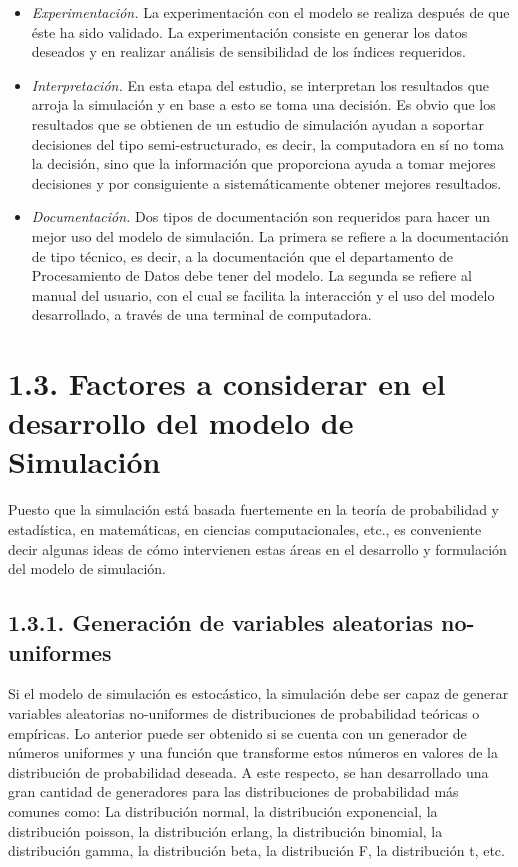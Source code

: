 \documentclass[11pt,letterpaper]{report}
\begin{document}
\begin{itemize}[leftmargin=*]
\item \emph{Experimentación.} La experimentación con el modelo se
realiza después de que éste ha sido validado. La experimentación
consiste en generar los datos deseados y en realizar análisis de
sensibilidad de los índices requeridos.

\item \emph{Interpretación.} En esta etapa del estudio, se interpretan
los resultados que arroja la simulación y en base a esto se toma una
decisión. Es obvio que los resultados que se obtienen de un estudio de
simulación ayudan a soportar decisiones del tipo semi-estructurado, es
decir, la computadora en sí no toma la decisión, sino que la información
que proporciona ayuda a tomar mejores decisiones y por consiguiente a
sistemáticamente obtener mejores resultados.

\item \emph{Documentación.} Dos tipos de documentación son requeridos
para hacer un mejor uso del modelo de simulación. La primera se refiere
a la documentación de tipo técnico, es decir, a la documentación que el
departamento de Procesamiento de Datos debe tener del modelo. La segunda
se refiere al manual del usuario, con el cual se facilita la interacción
y el uso del modelo desarrollado, a través de una terminal de
computadora.
\end{itemize}

\section*{1.3. Factores a considerar en el desarrollo del modelo de Simulación}

Puesto que la simulación está basada fuertemente en la teoría de
probabilidad y estadística, en matemáticas, en ciencias computacionales,
etc., es conveniente decir algunas ideas de cómo intervienen estas áreas
en el desarrollo y formulación del modelo de simulación.

\subsection*{1.3.1. Generación de variables aleatorias no-uniformes}

Si el modelo de simulación es estocástico, la simulación debe ser capaz
de generar variables aleatorias no-uniformes de distribuciones de
probabilidad teóricas o empíricas. Lo anterior puede ser obtenido si se
cuenta con un generador de números uniformes y una función que
transforme estos números en valores de la distribución de probabilidad
deseada. A este respecto, se han desarrollado una gran cantidad de
generadores para las distribuciones de probabilidad más comunes como: La
distribución normal, la distribución exponencial, la distribución
poisson, la distribución erlang, la distribución binomial, la
distribución gamma, la distribución beta, la distribución F, la
distribución t, etc.
\end{document}
